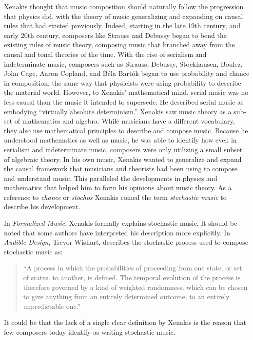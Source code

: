 Xenakis thought that music composition should naturally follow the
progression that physics did, with the theory of music generalizing
and expanding on causal rules that had existed previously. Indeed,
starting in the late 19th century, and early 20th century, composers
like Strauss and Debussy began to bend the existing rules of music
theory, composing music that branched away from the causal and tonal
theories of the time. With the rise of serialism and
indeterminate music, composers such as Strauss, Debussy,
Stockhausen, Boulez, John Cage, Aaron Copland, and B\'{e}la Bart\'{o}k
began to use probability and chance in composition, the same way that
physicists were using probability to describe the material
world. However, to Xenakis' mathematical mind, serial music was no
less causal than the music it intended to supersede. He described
serial music as embodying ``virtually absolute
determinism.''\cite{xenakis1992formalized} Xenakis saw music theory as
a sub-set of mathematics and algebra. While musicians have a different
vocabulary, they also use mathematical principles to describe and
compose music. Because he understood mathematics as well as music, he
was able to identify how even in serialism and indeterminate music,
composers were only utilizing a small subset of algebraic theory. In
his own music, Xenakis wanted to generalize and expand the causal
framework that musicians and theorists had been using to compose and
understand music. This paralleled the developments in physics and
mathematics that helped him to form his opinions about music theory.
As a reference to \emph{chance} or \emph{stochos} Xenakis coined the term
\emph{stochastic music} to describe his development.

In \textit{Formalized Music},\cite{xenakis1992formalized} Xenakis
formally explains stochastic music. It should be noted that some
authors have interpreted his description more explicitly. In
\textit{Audible Design}, Trevor Wishart, describes the stochastic
process used to compose stochastic music as:
\begin{quotation}
  ``A process in which the probabilities of proceeding from one state,
  or set of states. to another, is defined. The temporal evolution of
  the process is therefore governed by a kind of weighted
  randomness. which can be chosen to give anything from an entirely
  determined outcome, to an entirely unpredictable
  one.''\cite{Wishart1994}
\end{quotation}
It could be that the lack of a single clear definition by Xenakis is
the reason that few composers today identify as writing stochastic
music.

